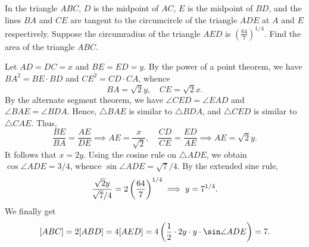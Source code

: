 \begin{question}[7]\label{A::2023-O-1-21}
    In the triangle $ABC$, $D$ is the midpoint of $AC$, $E$ is the midpoint of $BD$, and the lines $BA$ and $CE$ are tangent to the circumcircle of the triangle $ADE$ at $A$ and $E$ respectively. Suppose the circumradius of the triangle $AED$ is $(\frac{64}{7})^{1/4}$. Find the area of the triangle $ABC$.
\end{question}
\begin{center}
\end{center}
\begin{solution*}
    Let $AD = DC = x$ and $BE = ED = y$. By the power of a point theorem, we have $BA^2 = BE \cdot BD$ and $CE^2 = CD \cdot CA$, whence \[BA = \sqrt{2}y, \quad CE = \sqrt{2}x.\] By the alternate segment theorem, we have $\angle CED = \angle EAD$ and $\angle BAE = \angle BDA$. Hence, $\triangle BAE$ is similar to $\triangle BDA$, and $\triangle CED$ is similar to $\triangle CAE$. Thus, \[\frac{BE}{BA} = \frac{AE}{DE} \implies AE = \frac{x}{\sqrt2}, \quad \frac{CD}{CE} = \frac{ED}{AE} \implies AE = \sqrt{2}y.\] It follows that $x = 2y$. Using the cosine rule on $\triangle ADE$, we obtain $\cos \angle ADE = 3/4$, whence $\sin \angle ADE = \sqrt{7}/4$. By the extended sine rule, \[\frac{\sqrt{2}y}{\sqrt{7}/{4}} = 2\left( \frac{64}{7} \right)^{1/4} \implies y = 7^{1/4}.\] We finally get \[[ABC] = 2[ABD] = 4[AED] = 4 \bp{\frac12 \cdot 2y \cdot y \cdot \sin \angle ADE} = 7.\]
\end{solution*}

